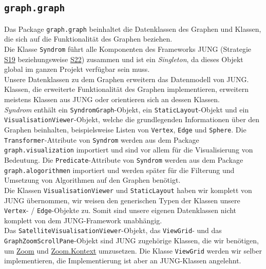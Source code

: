 \documentclass[enabledeprecatedfontcommands,fontsize=11pt,paper=a4,twoside]{scrartcl}
\newcounter{one}
\begin{document}





\newpage

\subsection{\texttt{graph.graph}}

Das Package \texttt{graph.graph} beinhaltet die Datenklassen des Graphen und Klassen, die sich auf die Funktionalität des Graphen beziehen. \\

Die Klasse \texttt{Syndrom} führt alle Komponenten des Frameworks JUNG (Strategie \hyperlink{eee}{S19} beziehungsweise \hyperlink{fff}{S22}) zusammen und ist ein \textit{Singleton}, da dieses Objekt global im ganzen Projekt verfügbar sein muss. \\
Unsere Datenklassen zu dem Graphen erweitern das Datenmodell von JUNG. Klassen, die erweiterte Funktionalität des Graphen implementieren, erweitern meistens Klassen aus JUNG oder orientieren sich an dessen Klassen. \\

\textit{Syndrom} enthält ein \texttt{SyndromGraph}-Objekt, ein \texttt{StaticLayout}-Objekt und ein \texttt{VisualisationViewer}-Objekt, welche die grundlegenden Informationen über den Graphen beinhalten, beispielsweise Listen von \texttt{Vertex}, \texttt{Edge} und \texttt{Sphere}. Die \texttt{Transformer}-Attribute von \texttt{Syndrom} werden aus dem Package \texttt{graph.visualization} importiert und sind vor allem für die Visualisierung von Bedeutung. Die \texttt{Predicate}-Attribute von \texttt{Syndrom} werden aus dem Package \texttt{graph.alogorithmen} importiert und werden später für die Filterung und Umsetzung von Algorithmen auf den Graphen benötigt. \\

Die Klassen \texttt{VisualisationViewer} und \texttt{StaticLayout} haben wir komplett von JUNG übernommen, wir weisen den generischen Typen der Klassen unsere \texttt{Vertex}- / \texttt{Edge}-Objekte zu. Somit sind unsere eigenen Datenklassen nicht  komplett von dem JUNG-Framework unabhängig.\\

Das \texttt{SatelliteVisualisationViewer}-Objekt, das \texttt{ViewGrid}- und das \texttt{GraphZoomScrollPane}-Objekt sind JUNG zugehörige Klassen, die wir benötigen, um \hyperlink{dd}{Zoom} und \hyperlink{ff}{Zoom.Kontext} umzusetzen. Die Klasse \texttt{ViewGrid} werden wir selber implementieren, die Implementierung ist aber an JUNG-Klassen angelehnt.\\
\end{document}
